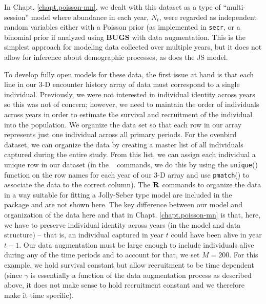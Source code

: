 In Chapt. \ref{chapt.poisson-mn}, we dealt with this dataset as a type
of ``multi-session''
model where abundance in each year, $N_{t}$, were regarded as
independent random variables either with a Poisson prior (as
implemented in \mbox{\tt secr}, or a binomial prior if analyzed using
{\bf BUGS} with data augmentation.
This 
is the simplest approach for modeling data
collected over multiple years, but it does not allow for inference
about demographic processes, as does the JS model.

To develop fully open models for these data, 
the first issue  at hand is that each line in our 3-D encounter history
array of
data must correspond to a single individual.  Previously, we were not
interested in individual identity across years so this was not of
concern; however, we need to maintain the order of individuals across years
in order to estimate the survival and recruitment of the individual into the population.
We organize the data set so that each row in our
array represents just one individual across all primary periods.
For the ovenbird dataset, we
can organize the data by creating a master list of all individuals
captured during the entire study.  From this list, we can assign each
individual a unique row in our dataset (in the \R~ commands,
we do this by using the \mbox{\tt unique}() function
on the row names
for each year of our 3-D array and use \mbox{\tt pmatch}()
to associate the data to the correct column).  The ${\bf R}$ commands
to organize the data in a way suitable for fitting a Jolly-Seber type
model 
are included in the \scrbook~ package and are not
shown here.
The key difference between our model and organization of the data here and that 
in
Chapt. \ref{chapt.poisson-mn} is that, here, we have to preserve
individual identity across years (in the model and data structure) -- that is, 
an individual captured in 
year $t$ could have been alive in year $t-1$.  Our data
augmentation must be large enough to include individuals alive during
any of the time periods and to account for that, we set $M=200$.  For this example,
we hold survival constant but allow recruitment to be time dependent
(since $\gamma$ is essentially a function of the data augmentation
process as described above, it does not make sense to hold recruitment constant and we
therefore make it time specific).


